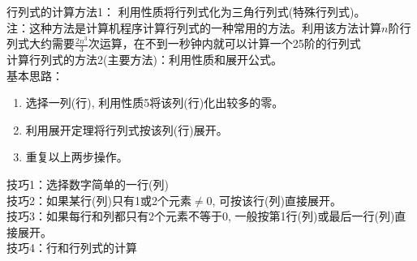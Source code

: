 {\color{blue}行列式的计算方法1：} 利用性质将行列式化为三角行列式(特殊行列式)。\\
{\color{red}注：}这种方法是计算机程序计算行列式的一种常用的方法。利用该方法计算$n$阶行列式大约需要$\frac{2n^{3}}{3}$次运算，在不到一秒钟内就可以计算一个25阶的行列式\\
{\color{blue}计算行列式的方法2(主要方法)：}利用性质和展开公式。 \\
{\color{blue}基本思路：}
\begin{enumerate}
    \item{选择一列(行), 利用性质5将该列(行)化出较多的零。}
    \item{利用展开定理将行列式按该列(行)展开。}
    \item{重复以上两步操作。}
\end{enumerate}
{\color{blue}技巧1：}选择数字简单的一行(列)\\
{\color{blue}技巧2：}如果某行(列)只有1或2个元素$\neq 0$, 可按该行(列)直接展开。\\
{\color{blue}技巧3：}如果每行和列都只有2个元素不等于0, 一般按第1行(列)或最后一行(列)直接展开。\\
{\color{blue}技巧4：}行和行列式的计算
